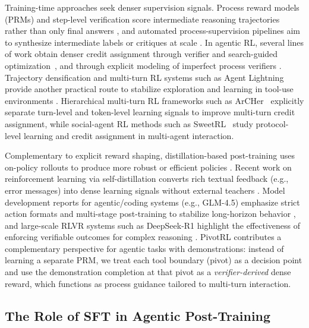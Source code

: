 Training-time approaches seek denser supervision signals.
Process reward models (PRMs) and step-level verification score intermediate reasoning trajectories rather than only final answers \citep{lightman2023letsverifystepstep}, and automated process-supervision pipelines aim to synthesize intermediate labels or critiques at scale \citep{luo2024improvemathematicalreasoninglanguage}.
In agentic RL, several lines of work obtain denser credit assignment through verifier and search-guided optimization~\citep{dong2025agenticreinforcedpolicyoptimization,ji2025treesearchllmrl}, and through explicit modeling of imperfect process verifiers \citep{rohatgi2025tamingprocessverifiers}.
Trajectory densification and multi-turn RL systems such as Agent Lightning provide another practical route to stabilize exploration and learning in tool-use environments \citep{luo2025agentlightningtrainai}.
Hierarchical multi-turn RL frameworks such as ArCHer~\citep{zhou2024archer} explicitly separate turn-level and token-level learning signals to improve multi-turn credit assignment, while social-agent RL methods such as SweetRL~\citep{zhou2025sweetrl} study protocol-level learning and credit assignment in multi-agent interaction.

Complementary to explicit reward shaping, distillation-based post-training uses on-policy rollouts to produce more robust or efficient policies \citep{lu2025onpolicydistillation}.
Recent work on reinforcement learning via self-distillation converts rich textual feedback (e.g., error messages) into dense learning signals without external teachers \citep{hubotter2026selfdistillation}.
Model development reports for agentic/coding systems (e.g., GLM-4.5) emphasize strict action formats and multi-stage post-training to stabilize long-horizon behavior \citep{5team2025glm45agenticreasoningcoding}, and large-scale RLVR systems such as DeepSeek-R1 highlight the effectiveness of enforcing verifiable outcomes for complex reasoning \citep{Guo_2025}.
PivotRL contributes a complementary perspective for agentic tasks with demonstrations: instead of learning a separate PRM, we treat each tool boundary (pivot) as a decision point and use the demonstration completion at that pivot as a \emph{verifier-derived} dense reward, which functions as process guidance tailored to multi-turn interaction.

\subsection{The Role of SFT in Agentic Post-Training}

